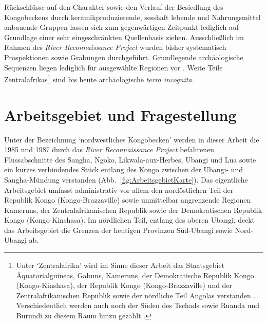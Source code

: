 Rückschlüsse auf den Charakter sowie den Verlauf der Besiedlung des Kongobeckens durch keramikproduzierende, sesshaft lebende und Nahrungsmittel anbauende Gruppen lassen sich zum gegenwärtigen Zeitpunkt lediglich auf Grundlage einer sehr eingeschränkten Quellenbasis ziehen. Ausschließlich im Rahmen des \textit{River Reconnaissance Project} wurden bisher systematisch Prospektionen sowie Grabungen durchgeführt. Grundlegende archäologische Sequenzen liegen lediglich für ausgewählte Regionen vor \parencites{Wotzka.1995}{MbidaMindzie.19951996}{AssokoNdong.20002001}{Clist.20042005}{Lavachery.2010}. Weite Teile Zentralafrikas\footnote{Unter \enquote*{Zentralafrika} wird im Sinne dieser Arbeit das Staatsgebiet Äquatorialguineas, Gabuns, Kameruns, der Demokratische Republik Kongo (Kongo-Kinshasa), der Republik Kongo (Kongo-Brazzaville) und der Zentralafrikanischen Republik sowie der nördliche Teil Angolas verstanden \parencite{Eggert.2014}. Verschiedentlich werden auch noch der Süden des Tschads sowie Ruanda und Burundi zu diesem Raum hinzu gezählt \parencite{Maret.2005}.} sind bis heute archäologische \textit{terra incognita}.

\section{Arbeitsgebiet und Fragestellung}\label{sec:Arbeitsgebiet}

Unter der Bezeichnung \enquote*{nordwestliches Kongobecken} werden in dieser Arbeit die 1985 und 1987 durch das \textit{River Reconnaissance Project} befahrenen Flussabschnitte des Sangha, Ngoko, Likwala-aux-Herbes, Ubangi und Lua sowie ein kurzes verbindendes Stück entlang des Kongo zwischen der Ubangi- und Sangha-Mündung verstanden (Abb.~\ref{fig:ArbeitsgebietKarte}). Das eigentliche Arbeitsgebiet umfasst administrativ vor allem den nordöstlichen Teil der Republik Kongo (Kongo-Brazzaville) sowie unmittelbar angrenzende Regionen Kameruns, der Zentralafrikanischen Republik sowie der Demokratischen Republik Kongo (Kongo-Kinshasa). Im nördlichen Teil, entlang des oberen Ubangi, deckt das Arbeitsgebiet die Grenzen der heutigen Provinzen Süd-Ubangi sowie Nord-Ubangi ab.

